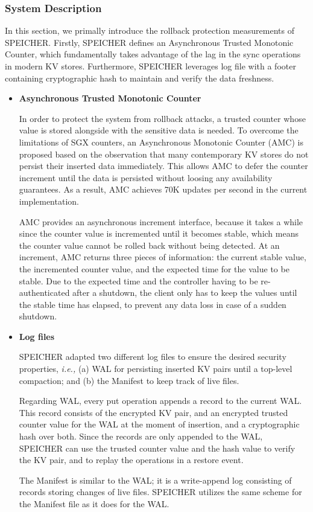 \subsubsection{System Description}
In this section, we primally introduce the rollback protection measurements of SPEICHER. Firstly, SPEICHER defines an Asynchronous Trusted Monotonic Counter, which fundamentally takes advantage of the lag in the sync operations in modern KV stores. Furthermore, SPEICHER leverages log file with a footer containing cryptographic hash to maintain and verify the data freshness. 
\begin{itemize}
	\item \textbf{Asynchronous Trusted Monotonic Counter}
	
	 In order to protect the system from rollback attacks, a trusted counter whose value is stored alongside with the sensitive data is needed. To overcome the limitations of SGX counters, an Asynchronous Monotonic Counter (AMC) is proposed based on the observation that many contemporary KV stores do not persist their inserted data immediately. This allows AMC to defer the counter increment until the data is persisted without loosing any availability guarantees. As a result, AMC achieves 70K updates per second in the current implementation.

AMC provides an asynchronous increment interface, because it takes a while since the counter value is incremented until it becomes stable, which means the counter value cannot be rolled back without being detected. At an increment, AMC returns three pieces of information: the current stable value, the incremented counter value, and the expected time for the value to be stable. Due to the expected time and the controller having to be re-authenticated after a shutdown, the client only has to keep the values until the stable time has elapsed, to prevent any data loss in case of a sudden shutdown.

	
	\item \textbf{Log files}
	
	SPEICHER adapted two different log files to ensure the desired security properties, \textit{i.e.,} (a) WAL for persisting inserted KV pairs until a top-level compaction; and (b) the Manifest to keep track of live files. 
	
	Regarding WAL, every put operation appends a record to the current WAL. This record consists of the encrypted KV pair, and an encrypted trusted counter value for the WAL at the moment of insertion, and a cryptographic hash over both. Since the records are only appended to the WAL, SPEICHER can use the trusted counter value and the hash value to verify the KV pair, and to replay the operations in a restore event.

The Manifest is similar to the WAL; it is a write-append log consisting of records storing changes of live files. SPEICHER utilizes the same scheme for the Manifest file as it does for the WAL. 
\end{itemize}

